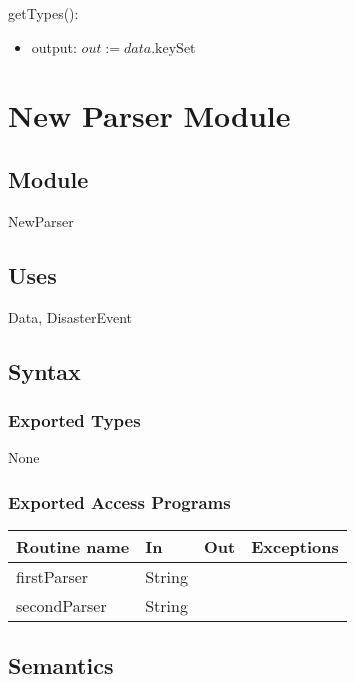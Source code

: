 \documentclass[12pt]{article}
\begin{document}
\noindent getTypes():
\begin{itemize}
\item output: $out := data.\mbox{keySet}$
\end{itemize}

\newpage





\section* {New Parser Module}

\subsection* {Module}

NewParser

\subsection* {Uses}

Data, DisasterEvent

\subsection* {Syntax}

\subsubsection* {Exported Types}

None

\subsubsection* {Exported Access Programs}

\begin{tabular}{| l | l | l | l |}
\hline
\textbf{Routine name} & \textbf{In} & \textbf{Out} & \textbf{Exceptions}\\
\hline
firstParser & String & ~ & ~ \\
\hline
secondParser & String & ~ & ~ \\
\hline
\end{tabular}

\subsection* {Semantics}
\end{document}
